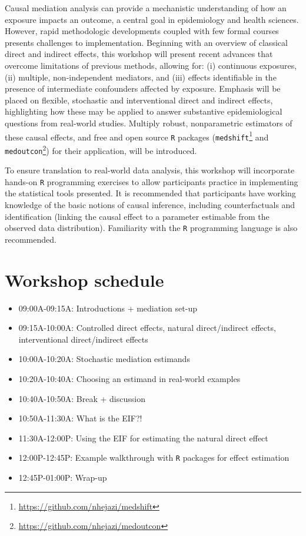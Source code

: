 \documentclass[
  12pt,
]{book}
\newcommand{\passthrough}[1]{#1}
\providecommand{\tightlist}{%
  \setlength{\itemsep}{0pt}\setlength{\parskip}{0pt}}
\renewcommand{\href}[2]{#2\footnote{\url{#1}}}
\theoremstyle{definition}
\theoremstyle{definition}
\theoremstyle{definition}
\newcommand{\1}{\mathbbm{1}}
\begin{document}
Causal mediation analysis can provide a mechanistic understanding of how an
exposure impacts an outcome, a central goal in epidemiology and health sciences.
However, rapid methodologic developments coupled with few formal courses
presents challenges to implementation. Beginning with an overview of classical
direct and indirect effects, this workshop will present recent advances that
overcome limitations of previous methods, allowing for: (i) continuous
exposures, (ii) multiple, non-independent mediators, and (iii) effects
identifiable in the presence of intermediate confounders affected by exposure.
Emphasis will be placed on flexible, stochastic and interventional direct and
indirect effects, highlighting how these may be applied to answer substantive
epidemiological questions from real-world studies. Multiply robust,
nonparametric estimators of these causal effects, and free and open source \passthrough{\lstinline!R!}
packages (\href{https://github.com/nhejazi/medshift}{\passthrough{\lstinline!medshift!}} and
\href{https://github.com/nhejazi/medoutcon}{\passthrough{\lstinline!medoutcon!}}) for their application, will
be introduced.

To ensure translation to real-world data analysis, this workshop will
incorporate hands-on \passthrough{\lstinline!R!} programming exercises to allow participants practice in
implementing the statistical tools presented. It is recommended that
participants have working knowledge of the basic notions of causal inference,
including counterfactuals and identification (linking the causal effect to a
parameter estimable from the observed data distribution). Familiarity with the
\passthrough{\lstinline!R!} programming language is also recommended.

\hypertarget{schedule}{%
\section{Workshop schedule}\label{schedule}}

\begin{itemize}
\tightlist
\item
  09:00A-09:15A: Introductions + mediation set-up
\item
  09:15A-10:00A: Controlled direct effects, natural direct/indirect effects,
  interventional direct/indirect effects
\item
  10:00A-10:20A: Stochastic mediation estimands
\item
  10:20A-10:40A: Choosing an estimand in real-world examples
\item
  10:40A-10:50A: Break + discussion
\item
  10:50A-11:30A: What is the EIF?!
\item
  11:30A-12:00P: Using the EIF for estimating the natural direct effect
\item
  12:00P-12:45P: Example walkthrough with \passthrough{\lstinline!R!} packages for effect estimation
\item
  12:45P-01:00P: Wrap-up
\end{itemize}
\end{document}
